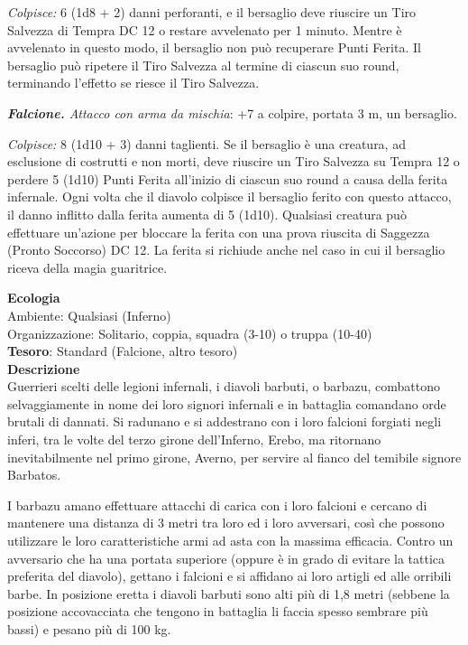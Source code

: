 \begin{multicols}{2}
\textit{Colpisce:} 6 (1d8 + 2) danni perforanti, e il bersaglio deve riuscire un Tiro Salvezza di Tempra DC 12 o restare avvelenato per 1 minuto. Mentre è avvelenato in questo modo, il bersaglio non può recuperare Punti Ferita. Il bersaglio può ripetere il Tiro Salvezza al termine di ciascun suo round, terminando l'effetto se riesce il Tiro Salvezza.

\textit{\textbf{Falcione.} Attacco con arma da mischia}: +7 a colpire, portata 3 m, un bersaglio.

\textit{Colpisce:} 8 (1d10 + 3) danni taglienti. Se il bersaglio è una creatura, ad esclusione di costrutti e non morti, deve riuscire un Tiro Salvezza su Tempra 12 o perdere 5 (1d10) Punti Ferita all'inizio di ciascun suo round a causa della ferita infernale. Ogni volta che il diavolo colpisce il bersaglio ferito con questo attacco, il danno inflitto dalla ferita aumenta di 5 (1d10). Qualsiasi creatura può effettuare un'azione per bloccare la ferita con una prova riuscita di Saggezza (Pronto Soccorso) DC 12. La ferita si richiude anche nel caso in cui il bersaglio riceva della magia guaritrice.

\textbf{Ecologia}\\
Ambiente: Qualsiasi (Inferno)\\
Organizzazione: Solitario, coppia, squadra (3-10) o truppa (10-40)\\
\textbf{Tesoro}: Standard (Falcione, altro tesoro)\\
\textbf{Descrizione}\\
Guerrieri scelti delle legioni infernali, i diavoli barbuti, o barbazu, combattono selvaggiamente in nome dei loro signori infernali e in battaglia comandano orde brutali di dannati. Si radunano e si addestrano con i loro falcioni forgiati negli inferi, tra le volte del terzo girone dell'Inferno, Erebo, ma ritornano inevitabilmente nel primo girone, Averno, per servire al fianco del temibile signore Barbatos.

I barbazu amano effettuare attacchi di carica con i loro falcioni e cercano di mantenere una distanza di 3 metri tra loro ed i loro avversari, così che possono utilizzare le loro caratteristiche armi ad asta con la massima efficacia. Contro un avversario che ha una portata superiore (oppure è in grado di evitare la tattica preferita del diavolo), gettano i falcioni e si affidano ai loro artigli ed alle orribili barbe. In posizione eretta i diavoli barbuti sono alti più di 1,8 metri (sebbene la posizione accovacciata che tengono in battaglia li faccia spesso sembrare più bassi) e pesano più di 100 kg.



\end{multicols}

